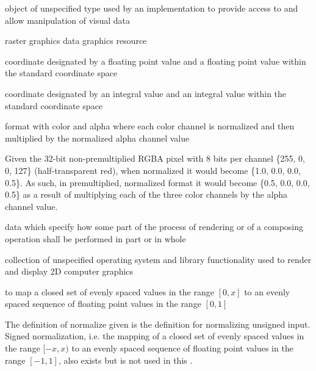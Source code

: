 %
%
 object of unspecified type used by an implementation to provide access to and allow manipulation of visual data

\indexdefn{\pixmap}%
raster graphics data graphics resource

%
 coordinate designated by a floating point \xaxis{} value and a floating point \yaxis{} value within the standard coordinate space

%
 coordinate designated by an integral \xaxis{} value and an integral \yaxis{} value within the standard coordinate space

%
format with color and alpha where each color channel is normalized and then 
multiplied by the normalized alpha channel value
\begin{example}
Given the 32-bit non-premultiplied RGBA pixel with 8 bits per channel \{255, 0, 
0, 127\} (half-transparent red), when normalized it would become \{1.0, 0.0, 
0.0, 0.5\}. As such, in premultiplied, normalized format it would become \{0.5, 
0.0, 0.0, 0.5\} as a result of multiplying each of the three color channels by 
the alpha channel value.
\end{example}

%
data which specify how some part of the process of rendering or of a composing operation shall be performed in part or in whole

%
collection of unspecified operating system and library functionality used to render and display 2D computer graphics

%
to map a closed set of evenly spaced values in the range $[0, x]$ to an evenly spaced sequence of floating point values in the range $[0, 1]$
\begin{note}
The definition of normalize given is the definition for normalizing unsigned input. Signed normalization, i.e. the mapping of a closed set of evenly spaced values in the range $[-x, x)$ to an evenly spaced sequence of floating point values in the range $[-1, 1]$, also exists but is not used in this \documenttypename{}.
\end{note}

